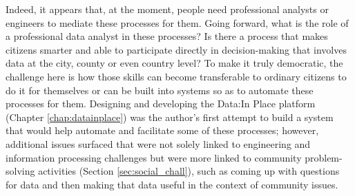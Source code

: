 Indeed, it appears that, at the moment, people need professional analysts or engineers to mediate these processes for them. Going forward, what is the role of a professional data analyst in these processes? Is there a process that makes citizens smarter and able to participate directly in decision-making that involves data at the city, county or even country level? To make it truly democratic, the challenge here is how those skills can become transferable to ordinary citizens to do it for themselves or can be built into systems so as to automate these processes for them. Designing and developing the Data:In Place platform (Chapter \ref{chap:datainplace}) was the author's first attempt to build a system that would help automate and facilitate some of these processes; however, additional issues surfaced that were not solely linked to engineering and information processing challenges but were more linked to community problem-solving activities (Section \ref{sec:social_chall}), such as coming up with questions for data and then making that data useful in the context of community issues. 

